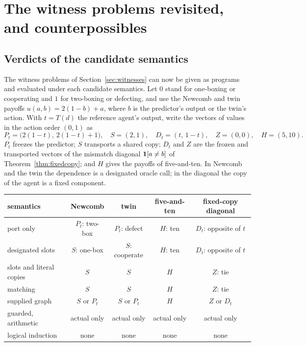 \section{The witness problems revisited, and counterpossibles}\label{sec:counterpossibles}

\subsection{Verdicts of the candidate semantics}

The witness problems of Section~\ref{sec:witnesses} can now be given as programs and evaluated
under each candidate semantics. Let $0$ stand for one-boxing or cooperating and $1$ for two-boxing or
defecting, and use the Newcomb and twin payoffs $u(a,b)=2(1-b)+a$, where $b$ is the predictor's
output or the twin's action. With $t=T(d)$ the reference agent's output, write the vectors of values
in the action order $(0,1)$ as
\[
  P_t=\bigl(2(1-t),\,2(1-t)+1\bigr),\quad S=(2,1),\quad D_t=(t,\,1-t),\quad Z=(0,0),\quad H=(5,10).
\]
$P_t$ freezes the predictor; $S$ transports a shared copy; $D_t$ and $Z$ are the frozen and transported
vectors of the mismatch diagonal $\mathbf{1}[a\ne b]$ of Theorem~\ref{thm:fixedcopy}; and $H$ gives the
payoffs of five-and-ten. In Newcomb and the twin the dependence is a designated oracle call; in the
diagonal the copy of the agent is a fixed component.

\begin{center}
\small
\renewcommand{\arraystretch}{1.2}
\begin{tabular}{@{}lcccc@{}}
  \toprule
  semantics & Newcomb & twin & five-and-ten & fixed-copy diagonal \\
  \midrule
  port only & $P_t$: two-box & $P_t$: defect & $H$: ten & $D_t$: opposite of $t$ \\
  designated slots & $S$: one-box & $S$: cooperate & $H$: ten & $D_t$: opposite of $t$ \\
  slots and literal copies & $S$ & $S$ & $H$ & $Z$: tie \\
  matching & $S$ & $S$ & $H$ & $Z$: tie \\
  supplied graph & $S$ or $P_t$ & $S$ or $P_t$ & $H$ & $Z$ or $D_t$ \\
  guarded, arithmetic & actual only & actual only & actual only & actual only \\
  logical induction & none & none & none & none \\
  \bottomrule
\end{tabular}
\end{center}

